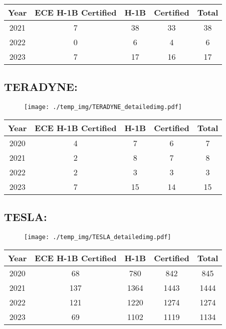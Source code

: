 \documentclass{article}%
\begin{document}
%
\begin{longtable}{c|c|c|c|c}%
\hline%
Year&ECE H{-}1B Certified&H{-}1B&Certified&Total\\%
\hline%
2021&7&38&33&38\\%
\hline%
2022&0&6&4&6\\%
\hline%
2023&7&17&16&17\\%
\hline%
\end{longtable}

%
\newpage%
\subsection{TERADYNE:}%
\label{subsec:TERADYNE}%
\label{TERADYNEdetailed}%


\begin{figure}[htbp]%
\centering%
\texttt{[image: ./temp\_img/TERADYNE\_detailedimg.pdf]}%
\end{figure}

%
\begin{longtable}{c|c|c|c|c}%
\hline%
Year&ECE H{-}1B Certified&H{-}1B&Certified&Total\\%
\hline%
2020&4&7&6&7\\%
\hline%
2021&2&8&7&8\\%
\hline%
2022&2&3&3&3\\%
\hline%
2023&7&15&14&15\\%
\hline%
\end{longtable}

%
\newpage%
\subsection{TESLA:}%
\label{subsec:TESLA}%
\label{TESLAdetailed}%


\begin{figure}[htbp]%
\centering%
\texttt{[image: ./temp\_img/TESLA\_detailedimg.pdf]}%
\end{figure}

%
\begin{longtable}{c|c|c|c|c}%
\hline%
Year&ECE H{-}1B Certified&H{-}1B&Certified&Total\\%
\hline%
2020&68&780&842&845\\%
\hline%
2021&137&1364&1443&1444\\%
\hline%
2022&121&1220&1274&1274\\%
\hline%
2023&69&1102&1119&1134\\%
\hline%
\end{longtable}
\end{document}
